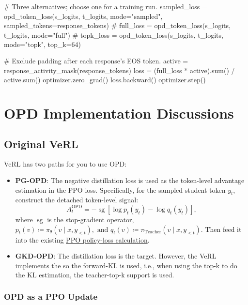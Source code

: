 \begin{codeblock}[language=Python]
    # Three alternatives; choose one for a training run.
    sampled_loss = opd_token_loss(s_logits, t_logits, mode="sampled", sampled_tokens=response_tokens)
    # full_loss = opd_token_loss(s_logits, t_logits, mode="full")
    # topk_loss = opd_token_loss(s_logits, t_logits, mode="topk", top_k=64)

    # Exclude padding after each response's EOS token.
    active = response_activity_mask(response_tokens)
    loss = (full_loss * active).sum() / active.sum()
    optimizer.zero_grad()
    loss.backward()
    optimizer.step()
\end{codeblock}


\section{OPD Implementation Discussions}

\subsection{Original VeRL}
VeRL has two paths for you to use OPD:
\begin{itemize}
    \item \textbf{PG-OPD}: The negative distillation loss is used as the token-level advantage estimation in the PPO loss. Specifically, for the sampled student token $y_t$, construct the detached token-level signal:
    $$ 
    A_t^{\mathrm{OPD}} = -\operatorname{sg}\left[ \log p_t(y_t) - \log q_t(y_t)\right], 
    $$
    where $\operatorname{sg}$ is the stop-gradient operator, $p_t(v)
    \coloneqq \pi_\theta(v\mid x,y_{<t}), \text{ and }
    q_t(v)\coloneqq \pi_{\mathrm{Teacher}}(v\mid x,y_{<t})$.
    Then feed it into the existing \href{https://github.com/verl-project/verl/blob/adc7eefa16dad75c5f7b878823d5a76eac90c7b3/verl/trainer/distillation/losses.py#L280-L288}{PPO policy-loss calculation}.
    
    \item \textbf{GKD-OPD}: The distillation loss is the target. However, the VeRL implements the \citet{agarwal2024policy} so the forward-KL is used, i.e., when using the top-k to do the KL estimation, the teacher-top-k support is used.
\end{itemize}

\subsubsection{OPD as a PPO Update}
\label{sec:opd.as-ppo}

